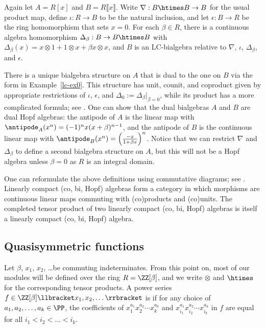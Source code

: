  \begin{example} 
Again let $A = R[x]$ and $B=R\llbracket x \rrbracket$. 
Write $\nabla : B \htimes B \to B$ for the usual product map,
define $\iota : R \to B$ to be the natural inclusion, 
and
let $\epsilon : B \to R$ be the ring homomorphism that sets $x=0$.
For each   $\beta \in R$, there is a continuous algebra homomorphism 
$\Delta_\beta : B \to B \htimes B$ with $\Delta_\beta(x) = x\otimes 1 + 1\otimes x+ \beta x \otimes x$,
and $B$ is an LC-bialgebra relative to $\nabla$, $\iota$, $\Delta_\beta$, and $\epsilon$.

There is a unique bialgebra structure on $A$ that is dual to the one on $B$ via the form in Example~\ref{lc-ex0}.
This structure has unit, counit, and coproduct given by appropriate restrictions of $\iota$, $\epsilon$, and $\Delta_0 := \Delta_\beta|_{\beta=0}$,
while its product  has a more complicated formula; see \cite[Ex. 2.4]{LM2019}.
One can show that the dual bialgebras $A$ and $B$ are dual Hopf algebras:
the antipode of $A$ is the linear map with $\antipode_A(x^n)  = (-1)^ n x(x+\beta)^{n-1}$,
and the antipode of $B$ is the continuous linear map with $\antipode_B(x^n)  =\left(\frac{-x}{1+\beta x}\right)^n$.
Notice that we can restrict $\nabla$ and $\Delta_\beta$ to define a second bialgebra structure on $A$, 
but this will not be a Hopf algebra unless $\beta=0$ as $R$ is an integral domain. 
\end{example}



One can  reformulate the above definitions using commutative diagrams; see 
\cite{Marberg2018}.
Linearly compact (co, bi, Hopf) algebras form a category in which morphisms are continuous linear maps 
commuting with (co)products and (co)units.
The completed tensor product of two linearly compact (co, bi, Hopf) algebras is
itself a linearly compact (co, bi, Hopf) algebra.

   



\subsection{Quasisymmetric functions}

Let $\beta$, $x_1$, $x_2$, \dots be commuting indeterminates.
From this point on, most of our modules will be defined over the ring $R=\ZZ[\beta]$,
and we write $\otimes $ and $\htimes$ for the corresponding tensor products.
A power series $f \in \ZZ[\beta]\llbracket x_1,x_2,\dots\rrbracket $ is  if
for any choice of $a_1,a_2,\dots,a_k \in \PP$,
the coefficients of $x_1^{a_1}x_2^{a_2}\cdots x_{k}^{a_k}$ and $x_{i_1}^{a_1}x_{i_2}^{a_2}\cdots x_{i_k}^{a_k}$
in $f$ are equal for all $i_1<i_2<\dots<i_k$.

